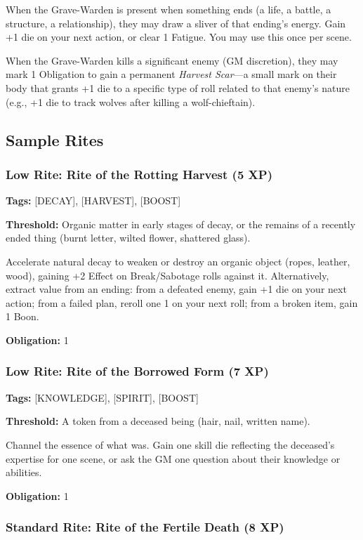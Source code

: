 When the Grave-Warden is present when something ends (a life, a battle, a structure, a relationship), they may draw a sliver of that ending's energy. Gain +1 die on your next action, or clear 1 Fatigue. You may use this once per scene.

When the Grave-Warden kills a significant enemy (GM discretion), they may mark 1 Obligation to gain a permanent \textit{Harvest Scar}—a small mark on their body that grants +1 die to a specific type of roll related to that enemy's nature (e.g., +1 die to track wolves after killing a wolf-chieftain).

\subsection{Sample Rites}

\subsubsection{Low Rite: Rite of the Rotting Harvest (5 XP)}

\textbf{Tags:} [DECAY], [HARVEST], [BOOST]

\textbf{Threshold:} Organic matter in early stages of decay, or the remains of a recently ended thing (burnt letter, wilted flower, shattered glass).

Accelerate natural decay to weaken or destroy an organic object (ropes, leather, wood), gaining +2 Effect on Break/Sabotage rolls against it. Alternatively, extract value from an ending: from a defeated enemy, gain +1 die on your next action; from a failed plan, reroll one 1 on your next roll; from a broken item, gain 1 Boon.

\textbf{Obligation:} 1

\subsubsection{Low Rite: Rite of the Borrowed Form (7 XP)}

\textbf{Tags:} [KNOWLEDGE], [SPIRIT], [BOOST]

\textbf{Threshold:} A token from a deceased being (hair, nail, written name).

Channel the essence of what was. Gain one skill die reflecting the deceased's expertise for one scene, or ask the GM one question about their knowledge or abilities.

\textbf{Obligation:} 1

\subsubsection{Standard Rite: Rite of the Fertile Death (8 XP)}

